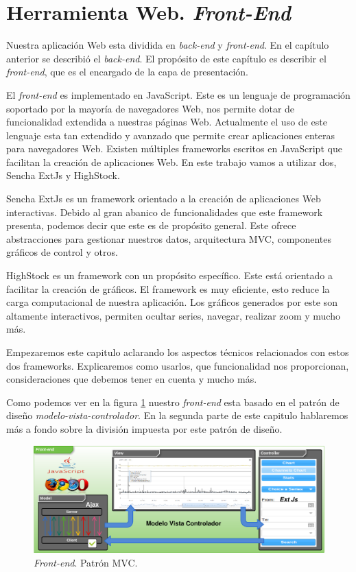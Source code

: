 \chapter{Herramienta Web. \emph{Front-End}}
\label{frontend}
Nuestra aplicación Web esta dividida en \emph{back-end} y \emph{front-end}. En el capítulo anterior se describió el \emph{back-end}. El propósito de
este capítulo es describir el \emph{front-end}, que es el encargado de la capa de presentación.
\par
El \emph{front-end} es implementado en JavaScript\cite{JavaScript}. Este es un lenguaje de programación soportado por la mayoría de navegadores Web,
nos permite dotar de funcionalidad extendida a nuestras páginas Web. Actualmente el uso de este lenguaje esta tan extendido y avanzado que permite
crear aplicaciones enteras para navegadores Web. Existen múltiples frameworks escritos en JavaScript que facilitan la creación de aplicaciones Web. En
este trabajo vamos a utilizar dos, Sencha ExtJs\cite{ExtJs} y HighStock\cite{HighStock}.
\par
Sencha ExtJs es un framework orientado a la creación de aplicaciones Web interactivas. Debido al gran abanico de funcionalidades que este framework
presenta, podemos decir que este es de propósito general. Este ofrece abstracciones para gestionar nuestros datos, arquitectura MVC, componentes
gráficos de control y otros.
\par
HighStock es un framework con un propósito específico. Este está orientado a facilitar la creación de gráficos. El framework es muy eficiente, esto
reduce la carga computacional de nuestra aplicación. Los gráficos generados por este son altamente interactivos, permiten ocultar series, navegar,
realizar zoom y mucho más.
\par
Empezaremos este capitulo aclarando los aspectos técnicos relacionados con estos dos frameworks. Explicaremos como usarlos, que funcionalidad nos
proporcionan, consideraciones que debemos tener en cuenta y mucho más.
\par
Como podemos ver en la figura \ref{frontend} nuestro \emph{front-end} esta basado en el patrón de diseño
\emph{modelo-vista-controlador}\cite{MVCWiki}. En la segunda parte de este capitulo hablaremos más a fondo sobre la división impuesta por este patrón
de diseño.
\begin{figure}[h]
	\centering
	\includegraphics[keepaspectratio, width=1\textwidth]{./img/frontend.png}
	\caption{\emph{Front-end}. Patrón MVC.}   
	\label{fig:frontend}
\end{figure}
